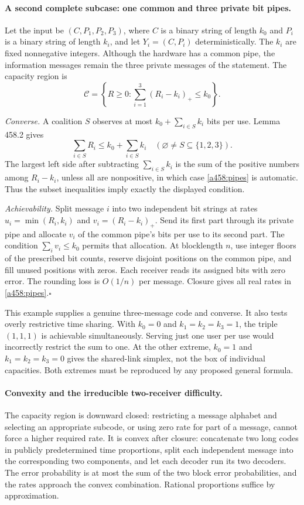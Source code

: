 \documentclass[11pt]{article}
\begin{document}
\paragraph{A second complete subcase: one common and three private bit pipes.}
Let the input be $(C,P_1,P_2,P_3)$, where $C$ is a binary string of length
$k_0$ and $P_i$ is a binary string of length $k_i$, and let
$Y_i=(C,P_i)$ deterministically. The $k_i$ are fixed nonnegative integers.
Although the hardware has a common pipe, the information messages remain
the three private messages of the statement. The capacity region is
\begin{equation}\label{a458:pipes}
 \mathcal C=\left\{R\ge0:\sum_{i=1}^3(R_i-k_i)_+\le k_0\right\}.
\end{equation}

\emph{Converse.} A coalition $S$ observes at most $k_0+\sum_{i\in S}k_i$
bits per use. Lemma 458.2 gives
\[
 \sum_{i\in S}R_i\le k_0+\sum_{i\in S}k_i
 \quad(\varnothing\ne S\subseteq\{1,2,3\}).
\]
The largest left side after subtracting $\sum_{i\in S}k_i$ is the
sum of the positive numbers among $R_i-k_i$, unless all are nonpositive,
in which case \eqref{a458:pipes} is automatic. Thus the subset inequalities
imply exactly the displayed condition.

\emph{Achievability.} Split message $i$ into two independent bit strings
at rates $u_i=\min(R_i,k_i)$ and $v_i=(R_i-k_i)_+$. Send its first part
through its private pipe and allocate $v_i$ of the common pipe's bits per
use to its second part. The condition $\sum_i v_i\le k_0$ permits that
allocation. At blocklength $n$, use integer floors of the prescribed bit
counts, reserve disjoint positions on the common pipe, and fill unused
positions with zeros. Each receiver reads its assigned bits with zero
error. The rounding loss is $O(1/n)$ per message. Closure gives all real
rates in \eqref{a458:pipes}.\hfill$\square$

This example supplies a genuine three-message code and converse. It also
tests overly restrictive time sharing. With $k_0=0$ and $k_1=k_2=k_3=1$,
the triple $(1,1,1)$ is achievable simultaneously. Serving just one user
per use would incorrectly restrict the sum to one. At the other extreme,
$k_0=1$ and $k_1=k_2=k_3=0$ gives the shared-link simplex, not the box
of individual capacities. Both extremes must be reproduced by any
proposed general formula.

\paragraph{Convexity and the irreducible two-receiver difficulty.}
The capacity region is downward closed: restricting a message alphabet
and selecting an appropriate subcode, or using zero rate for part of a
message, cannot force a higher required rate. It is convex after closure:
concatenate two long codes in publicly predetermined time proportions,
split each independent message into the corresponding two components,
and let each decoder run its two decoders. The error probability is at
most the sum of the two block error probabilities, and the rates approach
the convex combination. Rational proportions suffice by approximation.
\end{document}
